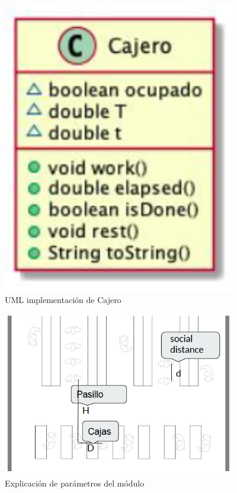 \documentclass{article}
\begin{document}
\begin{figure}[h]
\begin{center}
\includegraphics[width=4in]{./images/claseCajero.PNG}
\caption{UML implementación de Cajero }
\label{claseCajero}
\end{center}
\end{figure}

\begin{figure}[h]
\begin{center}
\includegraphics[width=4in]{./images/parametrosSuper.PNG}
\caption{Explicación de parámetros del módulo}
\label{supermercado}
\end{center}
\end{figure}
\end{document}
